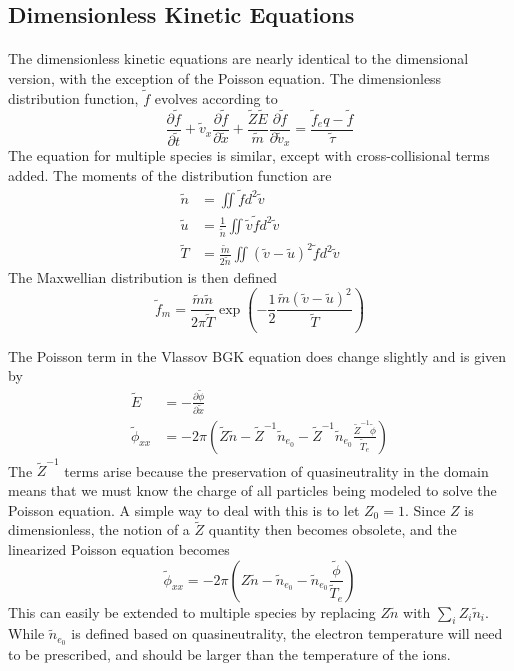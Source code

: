 \documentclass[11pt]{article}
\begin{document}
\subsection{Dimensionless Kinetic Equations}
\paragraph{}

The dimensionless kinetic equations are nearly identical to the dimensional version, with the exception of the Poisson equation. The dimensionless distribution function, $\tilde{f}$ evolves according to
\begin{equation*}
\frac{\partial\tilde{f}}{\partial\tilde{t}} + \tilde{v}_x\frac{\partial\tilde{f}}{\partial\tilde{x}} + \frac{\tilde{Z}\tilde{E}}{\tilde{m}}\frac{\partial\tilde{f}}{\partial\tilde{v}_x} = \frac{\tilde{f}_eq-\tilde{f}}{\tilde{\tau}}
\end{equation*}
The equation for multiple species is similar, except with cross-collisional terms added. The moments of the distribution function are
\begin{align*}
\tilde{n} &= \iint\tilde{f}d^2\tilde{v} \\
\tilde{u} &= \frac{1}{\tilde{n}}\iint\tilde{v}\tilde{f}d^2\tilde{v} \\
\tilde{T} &= \frac{\tilde{m}}{2\tilde{n}}\iint\left(\tilde{v}-\tilde{u}\right)^2\tilde{f}d^2\tilde{v}
\end{align*}
The Maxwellian distribution is then defined
\begin{equation*}
\tilde{f}_m = \frac{\tilde{m}\tilde{n}}{2\pi\tilde{T}} \exp\left(-\frac{1}{2}\frac{\tilde{m}\left(\tilde{v}-\tilde{u}\right)^2}{\tilde{T}}\right)
\end{equation*}

The Poisson term in the Vlassov BGK equation does change slightly and is given by
\begin{align*}
\tilde{E} 			&= -\frac{\partial\tilde{\phi}}{\partial\tilde{x}} \\
\tilde{\phi}_{xx}	&= -2\pi\left(\tilde{Z}\tilde{n} - \tilde{Z}^{-1}\tilde{n}_{e_0} - \tilde{Z}^{-1}\tilde{n}_{e_0}\frac{\tilde{Z}^{-1}\tilde{\phi}}{\tilde{T}_e}\right)
\end{align*}
The $\tilde{Z}^{-1}$ terms arise because the preservation of quasineutrality in the domain means that we must know the charge of all particles being modeled to solve the Poisson equation. A simple way to deal with this is to let $Z_0 = 1$. Since $Z$ is dimensionless, the notion of a $\tilde{Z}$ quantity then becomes obsolete, and the linearized Poisson equation becomes
\begin{equation*}
\tilde{\phi}_{xx} = -2\pi\left(Z\tilde{n} - \tilde{n}_{e_0} - \tilde{n}_{e_0}\frac{\tilde{\phi}}{\tilde{T}_e}\right)
\end{equation*}
This can easily be extended to multiple species by replacing $Z\tilde{n}$ with $\sum_{i}Z_i\tilde{n}_i$. While $\tilde{n}_{e_0}$ is defined based on quasineutrality, the electron temperature will need to be prescribed, and should be larger than the temperature of the ions.
\end{document}
